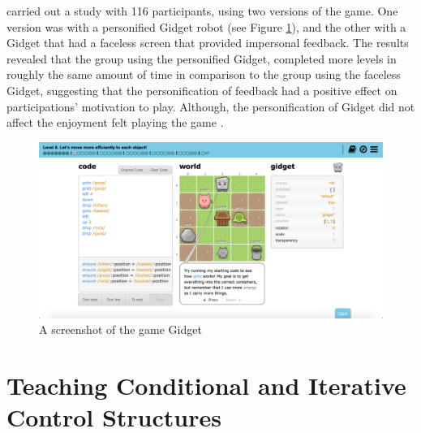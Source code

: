 \documentclass[a4paper,11.5pt]{report}
\numberwithin{figure}{section}
\numberwithin{table}{section}
\numberwithin{equation}{section}
\numberwithin{equation}{section}
\begin{document}
\citeauthor{lee2011} carried out a study with 116 participants, using two versions of the game. One version was with a personified Gidget robot (see Figure \ref{fig:Gidget-Example}), and the other with a Gidget that had a faceless screen that provided impersonal feedback. The results revealed that the group using the personified Gidget, completed more levels in roughly the same amount of time in comparison to the group using the faceless Gidget, suggesting that the personification of feedback had a positive effect on participations' motivation to play. Although, the personification of Gidget did not affect the enjoyment felt playing the game \citep{lee2011}.


\begin{figure}[H]
 \centering
    \includegraphics[width=1\textwidth]{Gidget-Example}
       \captionsetup{justification=centering}
\caption{A screenshot of the game Gidget {\citep{gidgetsite}}}
\label{fig:Gidget-Example}
\end{figure}














\section{Teaching Conditional and Iterative Control Structures}
\end{document}
